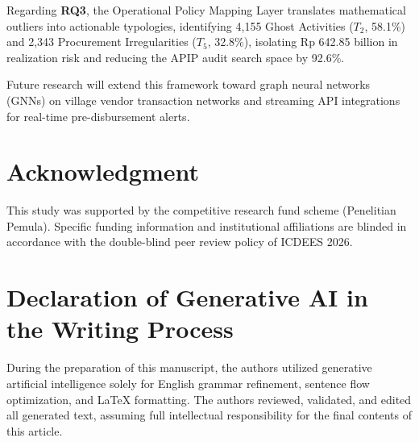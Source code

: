\documentclass[conference]{IEEEtran}
\begin{document}
Regarding \textbf{RQ3}, the Operational Policy Mapping Layer translates mathematical outliers into actionable typologies, identifying 4,155 Ghost Activities ($T_2$, 58.1\%) and 2,343 Procurement Irregularities ($T_5$, 32.8\%), isolating Rp 642.85 billion in realization risk and reducing the APIP audit search space by 92.6\%.

Future research will extend this framework toward graph neural networks (GNNs) on village vendor transaction networks and streaming API integrations for real-time pre-disbursement alerts.

\section*{Acknowledgment}
This study was supported by the competitive research fund scheme (Penelitian Pemula). Specific funding information and institutional affiliations are blinded in accordance with the double-blind peer review policy of ICDEES 2026.

\section*{Declaration of Generative AI in the Writing Process}
During the preparation of this manuscript, the authors utilized generative artificial intelligence solely for English grammar refinement, sentence flow optimization, and LaTeX formatting. The authors reviewed, validated, and edited all generated text, assuming full intellectual responsibility for the final contents of this article.

{\footnotesize


}
\end{document}
